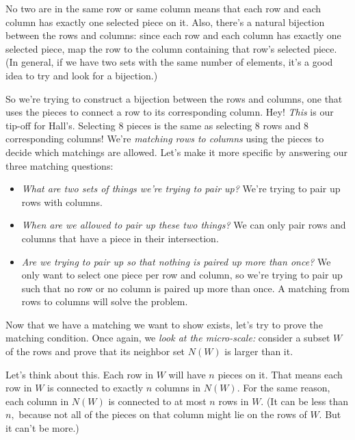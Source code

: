 \documentclass[11pt,paper=letter]{scrartcl}
\begin{document}
No two are in the same row or same column means that each row and each column has exactly one selected piece on it. Also, there's a natural bijection between the rows and columns: since each row and each column has exactly one selected piece, map the row to the column containing that row's selected piece. (In general, if we have two sets with the same number of elements, it's a good idea to try and look for a bijection.)

So we're trying to construct a bijection between the rows and columns, one that uses the pieces to connect a row to its corresponding column. Hey! \emph{This} is our tip-off for Hall's. Selecting $8$ pieces is the same as selecting $8$ rows and $8$ corresponding columns! We're \emph{matching rows to columns} using the pieces to decide which matchings are allowed. Let's make it more specific by answering our three matching questions:

\begin{itemize}

\item \emph{What are two sets of things we're trying to pair up?} We're trying to pair up rows with columns.

\item \emph{When are we allowed to pair up these two things?} We can only pair rows and columns that have a piece in their intersection.

\item \emph{Are we trying to pair up so that nothing is paired up more than once?} We only want to select one piece per row and column, so we're trying to pair up such that no row or no column is paired up more than once. A matching from rows to columns will solve the problem.

\end{itemize}

Now that we have a matching we want to show exists, let's try to prove the matching condition. Once again, we \emph{look at the micro-scale:} consider a subset $W$ of the rows and prove that its neighbor set $N(W)$ is larger than it.

Let's think about this. Each row in $W$ will have $n$ pieces on it. That means each row in $W$ is connected to exactly $n$ columns in $N(W)$. For the same reason, each column in $N(W)$ is connected to at most $n$ rows in $W$. (It can be less than $n,$ because not all of the pieces on that column might lie on the rows of $W$. But it can't be more.)
\end{document}
